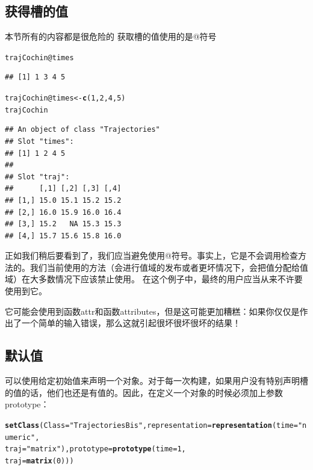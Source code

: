 \documentclass[12pt,a4paper]{article}\usepackage{graphicx, color}
\makeatletter
\newcommand{\hlfunctioncall}[1]{\textcolor[rgb]{0.501960784313725,0,0.329411764705882}{\textbf{#1}}}%
\newcommand{\hlstring}[1]{\textcolor[rgb]{0.6,0.6,1}{#1}}%
\newenvironment{kframe}{%
 \def\at@end@of@kframe{}%
 \ifinner\ifhmode%
  \def\at@end@of@kframe{\end{minipage}}%
  \begin{minipage}{\columnwidth}%
 \fi\fi%
 \def\FrameCommand##1{\hskip\@totalleftmargin \hskip-\fboxsep
 \colorbox{shadecolor}{##1}\hskip-\fboxsep
     \hskip-\linewidth \hskip-\@totalleftmargin \hskip\columnwidth}%
 \MakeFramed {\advance\hsize-\width
   \@totalleftmargin\z@ \linewidth\hsize
   \@setminipage}}%
 {\par\unskip\endMakeFramed%
 \at@end@of@kframe}
\newenvironment{knitrout}{}{} %
\makeatother
\begin{document}
\subsection{获得槽的值}
\scalebox{4}{\HandRight}本节所有的内容都是很危险的\scalebox{4}{\HandLeft}
获取槽的值使用的是@符号
\begin{knitrout}
\color{fgcolor}\begin{kframe}
\begin{alltt}
trajCochin@times
\end{alltt}
\begin{verbatim}
## [1] 1 3 4 5
\end{verbatim}
\begin{alltt}
trajCochin@times <- \hlfunctioncall{c}(1, 2, 4, 5)
trajCochin
\end{alltt}
\begin{verbatim}
## An object of class "Trajectories"
## Slot "times":
## [1] 1 2 4 5
## 
## Slot "traj":
##      [,1] [,2] [,3] [,4]
## [1,] 15.0 15.1 15.2 15.2
## [2,] 16.0 15.9 16.0 16.4
## [3,] 15.2   NA 15.3 15.3
## [4,] 15.7 15.6 15.8 16.0
\end{verbatim}
\end{kframe}
\end{knitrout}

正如我们稍后要看到了，我们应当避免使用@符号。事实上，它是不会调用检查方法的。我们当前使用的方法（会进行值域的发布或者更坏情况下，会把值分配给值域）在大多数情况下应该禁止使用。
在这个例子中，最终的用户应当从来不许要使用到它。

\scalebox{4}{\HandRight}它可能会使用到函数attr和函数attributes，但是这可能更加糟糕：如果你仅仅是作出了一个简单的输入错误，那么这就引起很坏很坏很坏的结果！

\subsection{默认值}
可以使用给定初始值来声明一个对象。对于每一次构建，如果用户没有特别声明槽的值的话，他们也还是有值的。因此，在定义一个对象的时候必须加上参数prototype：
\begin{knitrout}
\color{fgcolor}\begin{kframe}
\begin{alltt}
\hlfunctioncall{setClass}(Class = \hlstring{"TrajectoriesBis"}, representation = \hlfunctioncall{representation}(time = \hlstring{"numeric"}, 
    traj = \hlstring{"matrix"}), prototype = \hlfunctioncall{prototype}(time = 1, 
    traj = \hlfunctioncall{matrix}(0)))
\end{alltt}
\end{kframe}
\end{knitrout}
\end{document}
